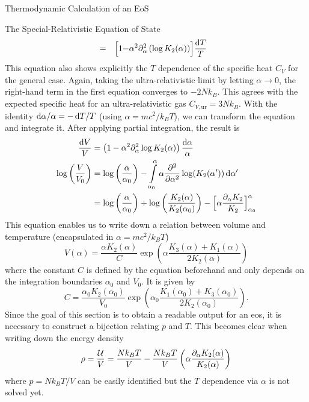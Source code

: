 \begin{section}{Thermodynamic Calculation of an EoS}
\begin{subsection}{The Special-Relativistic Equation of State}
\begin{alignat}{3}
    &= &\Bigl[1 - &\alpha^2\partial_\alpha^2\left(\log K_2(\alpha)\right)\Bigr]\frac{\mathop{}\!\mathrm{d} T}{T}
\end{alignat}
This equation also shows explicitly the $T$ dependence of the specific heat $C_V$ for the general case.
Again, taking the ultra-relativistic limit by letting $\alpha\rightarrow0$, the right-hand term in the first equation converges to $-2Nk_B$.
This agrees with the expected specific heat for an ultra-relativistic gas $C_{V,\text{ur}}=3Nk_B$.
With the identity $\mathop{}\!\mathrm{d}\alpha/\alpha = -\mathop{}\!\mathrm{d} T/T$ (using $\alpha=mc^2/k_BT$), we can transform the equation and integrate it.
After applying partial integration, the result is
\begin{align}
	\frac{\mathop{}\!\mathrm{d} V}{V} &= \left(1-\alpha^2\partial_\alpha^2\log K_2(\alpha)\right)\frac{\mathop{}\!\mathrm{d}\alpha}{\alpha}\\
    \log\left(\frac{V}{V_0}\right) &= \log\left(\frac{\alpha}{\alpha_0}\right) - \int\limits_{\alpha_0}^\alpha \alpha\frac{\partial^2}{\partial \alpha^2}\log(K_2(\alpha'))\mathop{}\!\mathrm{d}\alpha'\\
    &=\log\left(\frac{\alpha}{\alpha_0}\right) + \log\left(\frac{K_2(\alpha)}{K_2(\alpha_0)}\right) - \Bigl[\alpha\frac{\partial_\alpha K_2}{K_2}\Bigr]_{\alpha_0}^\alpha
\end{align}
This equation enables us to write down a relation between volume and temperature (encapsulated in $\alpha=mc^2/k_BT$)
\begin{equation}
	V(\alpha) = \frac{\alpha K_2(\alpha)}{C}\exp\left(\alpha\frac{K_3(\alpha)+K_1(\alpha)}{2K_2(\alpha)}\right)
\end{equation}
where the constant $C$ is defined by the equation beforehand and only depends on the integration boundaries $\alpha_0$ and $V_0$. It is given by
\begin{equation}
	C = \frac{\alpha_0 K_2(\alpha_0)}{V_0}\exp\left(\alpha_0\frac{K_1(\alpha_0)+K_3(\alpha_0)}{2K_2(\alpha_0)}\right).
\end{equation}
Since the goal of this section is to obtain a readable output for an \ac{eos}, it is necessary to construct a bijection relating $p$ and $T$.
This becomes clear when writing down the energy density %
\begin{equation}
	\rho = \frac{\mathcal{U}}{V} = \frac{Nk_BT}{V} - \frac{Nk_BT}{V}\left(\alpha\frac{\partial_\alpha K_2(\alpha)}{K_2(\alpha)}\right)
	\label{2-IntEner-DensityAlpha}
\end{equation}
where $p=Nk_BT/V$ can be easily identified but the $T$ dependence via $\alpha$ is not solved yet.\\

\end{subsection}
\end{section}
